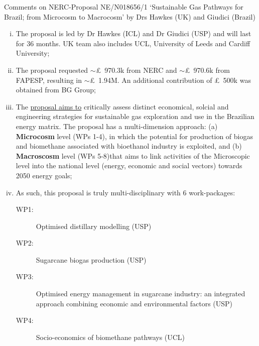 \documentclass[14pt,twoside]{report}
\begin{document}
\afterpage{%
    \clearpage%
    \thispagestyle{empty}%
    \begin{landscape}%
        \centering %
        \vfill
    \end{landscape}
    \clearpage%
}
\vfill
\clearpage



\begin{center}
  {\Large Comments on NERC-Proposal NE/N018656/1 `Sustainable Gas Pathways for Brazil; from Microcosm to Macrocosm' by Drs Hawkes (UK) and Giudici (Brazil)}
\end{center}
\begin{enumerate}[(i)]
%
   \item The proposal is led by Dr Hawkes (ICL) and Dr Giudici (USP) and will last for 36 months. UK team also includes UCL, University of Leeds and Cardiff University;
%
   \item The proposal requested $\sim$\pounds~970.3k from NERC and $\sim$\pounds~970.6k from FAPESP, resulting in $\sim$\pounds~1.94M. An additional contribution of \pounds~500k was obtained from BG Group;
%
   \item The \underline{proposal aims to} critically assess distinct economical, solcial and engineering strategies for sustainable gas exploration and use in the Brazilian energy matrix. The proposal has a multi-dimension approach: (a) {\bf Microcosm} level (WPs 1-4), in which the potential for production of biogas and biomethane associated with bioethanol industry is exploited, and (b) {\bf Macroscosm} level (WPs 5-8)that aims to link activities of the Microscopic level into the national level (energy, economic and social vectors) towards 2050 energy goals;
% 
   \item As such, this proposal is truly multi-disciplinary with 6 work-packages:
      \begin{description}
           \item[WP1:] Optimised distillary modelling (USP)
           \item[WP2:] Sugarcane biogas production (USP) 
           \item[WP3:] Optimised energy management in sugarcane industry: an integrated approach combining economic and environmental factors (USP)
           \item[WP4:] Socio-economics of biomethane pathways (UCL)

\end{description}
\end{enumerate}
\end{document}

